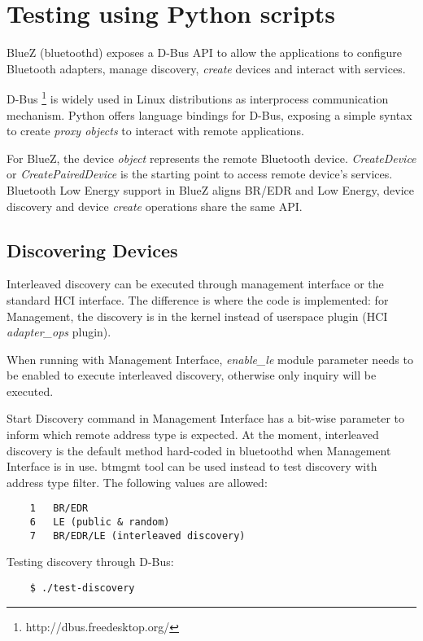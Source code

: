 \documentclass[11pt]{article}
\begin{document}
\section{Testing using Python scripts}

BlueZ (bluetoothd) exposes a D-Bus API to allow the applications to configure
Bluetooth adapters, manage discovery, {\em create} devices and interact with
services.

D-Bus \footnote{http://dbus.freedesktop.org/} is widely used in Linux
distributions as interprocess communication mechanism. Python offers
language bindings for D-Bus, exposing a simple syntax to create 
{\em proxy objects} to interact with remote applications.

For BlueZ, the device {\em object} represents the remote Bluetooth device.
{\em CreateDevice} or {\em CreatePairedDevice} is the starting point to access
remote device's services. Bluetooth Low Energy support in BlueZ aligns
BR/EDR and Low Energy, device discovery and device {\em create} operations
share the same API.

\subsection{Discovering Devices}

Interleaved discovery can be executed through management interface or the
standard HCI interface. The difference is where the code is implemented:
for Management, the discovery is in the kernel instead of userspace
plugin (HCI {\em adapter\_ops} plugin).

When running with Management Interface, {\em enable\_le} module parameter
needs to be enabled to execute interleaved discovery, otherwise only
inquiry will be executed.

Start Discovery command in Management Interface has a bit-wise parameter to
inform which remote address type is expected. At the moment, interleaved
discovery is the default method hard-coded in bluetoothd when Management
Interface is in use. btmgmt tool can be used instead to test discovery
with address type filter. The following values are allowed:

\begin{verbatim}
	1   BR/EDR
	6   LE (public & random)
	7   BR/EDR/LE (interleaved discovery)
\end{verbatim}

Testing discovery through D-Bus:
\begin{verbatim}
	$ ./test-discovery
\end{verbatim}
\end{document}
